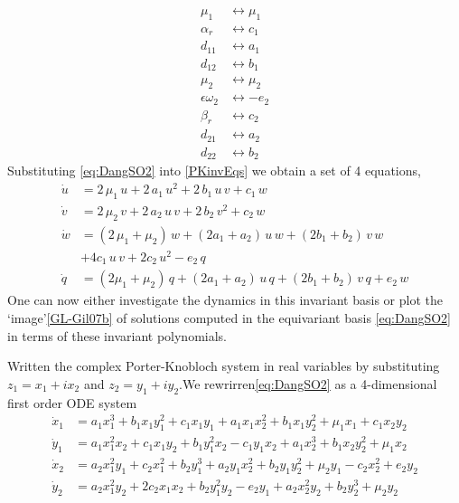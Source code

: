 \documentclass{article}
\begin{document}
\begin{align}
\mu_1&\leftrightarrow\mu_1\\
\alpha_r&\leftrightarrow c_1\\
d_{11}&\leftrightarrow a_1\\
d_{12}&\leftrightarrow b_1\\
\mu_2&\leftrightarrow\mu_2\\
\epsilon\omega_2&\leftrightarrow-e_2\\
\beta_r&\leftrightarrow c_2\\
d_{21}&\leftrightarrow a_2 \\
d_{22}&\leftrightarrow b_2
\end{align}
Substituting
\ref{eq:DangSO2} into \ref{PKinvEqs} we obtain a set of 4 equations,
\begin{equation}
\begin{split}
  \dot{u} &= 2\,\mu_1\,u+2\,a_1\,u^2+2\,b_1\,u\,v+c_1\,w\\
  \dot{v} &= 2\,\mu_2\,v+2\,a_2\,u\,v+2\,b_2\,v^2+c_2\,w\\
  \dot{w} &= (2\,\mu_1+\mu_2)\,w+(2a_1+a_2)\,u\,w+(2b_1+b_2)\,v\,w\\
	&+4c_1\,u\,v + 2c_2\,u^2 - e_2\,q
\label{PKinvEqs1}\\
  \dot{q} &= (2\mu_1+\mu_2)\,q+(2a_1+a_2)\,u\,q+(2b_1+b_2)\,v\,q
             +e_2\,w
\end{split}
\end{equation}
One can now either investigate the dynamics in this invariant basis or
plot the `image'\ref{GL-Gil07b} of solutions computed in the equivariant
basis \ref{eq:DangSO2} in terms of these invariant polynomials.


Written the complex Porter-Knobloch system in real variables by substituting $z_1 = x_1 + i x_2$ and $z_2 = y_1 + i y_2$.We rewrirren\ref{eq:DangSO2} as a 4-dimensional first order ODE system			
			\begin{align}
				\dot{x}_1 &= a_1 x_1^3 + b_1 x_1 y_1^2 + c_1 x_1 y_1 + a_1 x_1 x_2^2 + b_1 x_1 y_2^2 + \mu_1 x_1 + c_1 x_2 y_2\\
				\dot{y}_1 &= a_1 x_1^2 x_2 + c_1 x_1 y_2 + b_1 y_1^2 x_2 - c_1 y_1 x_2 + a_1 x_2^3 + b_1 x_2 y_2^2 + \mu_1 x_2\\
				\dot{x}_2 &= a_2 x_1^2 y_1 + c_2 x_1^2 + b_2 y_1^3 + a_2 y_1 x_2^2 + b_2 y_1 y_2^2 + \mu_2 y_1 - c_2 x_2^2 + e_2 y_2\\
				\dot{y}_2 &= a_2 x_1^2 y_2 + 2 c_2 x_1 x_2 + b_2 y_1^2 y_2 - e_2 y_1 + a_2 x_2^2 y_2 + b_2 y_2^3 + \mu_2 y_2
			\end{align}
\end{document}
